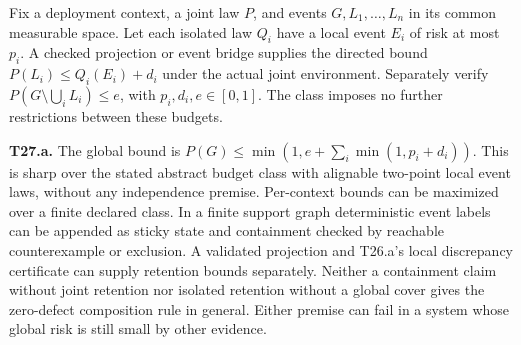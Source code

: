 \begin{theorem}\label{thm:t27}

Fix a deployment context, a joint law \(P\), and events \(G,L_1,\ldots,L_n\) in its common measurable space. Let each isolated law \(Q_i\) have a local event \(E_i\) of risk at most \(p_i\). A checked projection or event bridge supplies the directed bound \(P(L_i)\le Q_i(E_i)+d_i\) under the actual joint environment. Separately verify \(P(G\setminus\bigcup_i L_i)\le e\), with \(p_i,d_i,e\in[0,1]\). The class imposes no further restrictions between these budgets.

\label{thm:t27a}

\textbf{T27.a.} The global bound is \(P(G)\le\min(1,e+\sum_i\min(1,p_i+d_i))\). This is sharp over the stated abstract budget class with alignable two-point local event laws, without any independence premise. Per-context bounds can be maximized over a finite declared class. In a finite support graph deterministic event labels can be appended as sticky state and containment checked by reachable counterexample or exclusion. A validated projection and T26.a's local discrepancy certificate can supply retention bounds separately. Neither a containment claim without joint retention nor isolated retention without a global cover gives the zero-defect composition rule in general. Either premise can fail in a system whose global risk is still small by other evidence.

\end{theorem}

